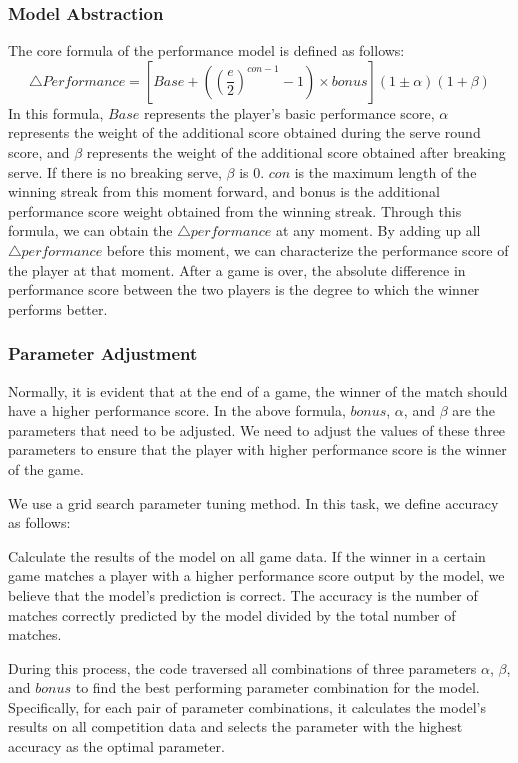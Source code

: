 \documentclass{mcmthesis}
\begin{document}
\subsubsection{Model Abstraction}
The core formula of the performance model is defined as follows:
\[
	\bigtriangleup Performance = [ Base + ((\frac{e}{2})^{con - 1} - 1) \times bonus](1 \pm \alpha)(1 + \beta)
\]
In this formula, $Base$ represents the player's basic performance score, $\alpha$ represents the weight of the additional score obtained during the serve round score, and $\beta$ represents the weight of the additional score obtained after breaking serve. If there is no breaking serve, $\beta$ is 0. $con$ is the maximum length of the winning streak from this moment forward, and bonus is the additional performance score weight obtained from the winning streak. Through this formula, we can obtain the $\bigtriangleup performance$ at any moment. By adding up all $\bigtriangleup performance$ before this moment, we can characterize the performance score of the player at that moment. After a game is over, the absolute difference in performance score between the two players is the degree to which the winner performs better.

\subsubsection{Parameter Adjustment}
Normally, it is evident that at the end of a game, the winner of the match should have a higher performance score. In the above formula, $bonus$, $\alpha$, and $\beta$ are the parameters that need to be adjusted. We need to adjust the values of these three parameters to ensure that the player with higher performance score is the winner of the game.

We use a grid search parameter tuning method. In this task, we define accuracy as follows: 

Calculate the results of the model on all game data. If the winner in a certain game matches a player with a higher performance score output by the model, we believe that the model's prediction is correct. The accuracy is the number of matches correctly predicted by the model divided by the total number of matches.

During this process, the code traversed all combinations of three parameters $\alpha$, $\beta$, and $bonus$ to find the best performing parameter combination for the model. Specifically, for each pair of parameter combinations, it calculates the model's results on all competition data and selects the parameter with the highest accuracy as the optimal parameter.
\end{document}
